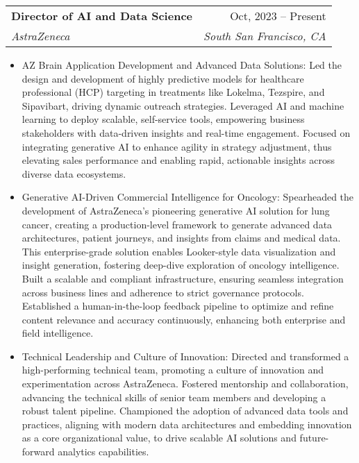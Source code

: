 \documentclass[letterpaper,11pt]{article}
\makeatletter
\newcommand{\resumeItem}[1]{
  \item{
    {#1 \vspace{-4pt}}
  }
}
\newcommand{\resumeSubheading}[4]{
  \vspace{-2pt}\item
    \begin{tabular*}{0.97\textwidth}[t]{l@{\extracolsep{\fill}}r}
      \textbf{#1} & #2 \\
      \textit{\small #3} & \textit{\small #4} \\
    \end{tabular*}\vspace{-10pt}
}
\newcommand{\resumeItemListStart}{\begin{itemize}}
\newcommand{\resumeItemListEnd}{\end{itemize}\vspace{-2pt}}
\makeatother
\begin{document}
    \resumeSubheading
      {Director of AI and Data Science}{Oct, 2023 -- Present}
      {AstraZeneca} {South San Francisco, CA}
      \resumeItemListStart
        \small\resumeItem{AZ Brain Application Development and Advanced Data Solutions: Led the design and development of highly predictive models for healthcare professional (HCP) targeting in treatments like Lokelma, Tezspire, and Sipavibart, driving dynamic outreach strategies. Leveraged AI and machine learning to deploy scalable, self-service tools, empowering business stakeholders with data-driven insights and real-time engagement. Focused on integrating generative AI to enhance agility in strategy adjustment, thus elevating sales performance and enabling rapid, actionable insights across diverse data ecosystems.}\resumeItem{Generative AI-Driven Commercial Intelligence for Oncology: Spearheaded the development of AstraZeneca's pioneering generative AI solution for lung cancer, creating a production-level framework to generate advanced data architectures, patient journeys, and insights from claims and medical data. This enterprise-grade solution enables Looker-style data visualization and insight generation, fostering deep-dive exploration of oncology intelligence. Built a scalable and compliant infrastructure, ensuring seamless integration across business lines and adherence to strict governance protocols. Established a human-in-the-loop feedback pipeline to optimize and refine content relevance and accuracy continuously, enhancing both enterprise and field intelligence.}
        \resumeItem{Technical Leadership and Culture of Innovation: Directed and transformed a high-performing technical team, promoting a culture of innovation and experimentation across AstraZeneca. Fostered mentorship and collaboration, advancing the technical skills of senior team members and developing a robust talent pipeline. Championed the adoption of advanced data tools and practices, aligning with modern data architectures and embedding innovation as a core organizational value, to drive scalable AI solutions and future-forward analytics capabilities.}   
        \resumeItemListEnd
\end{document}
